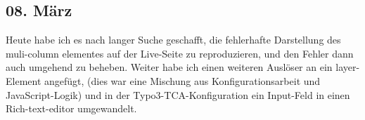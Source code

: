 \subsection{08. März}
Heute habe ich es nach langer Suche geschafft, die fehlerhafte Darstellung des muli-column elementes auf der Live-Seite zu reproduzieren, und den Fehler dann auch umgehend zu beheben. Weiter habe ich einen weiteren Auslöser an ein layer-Element angefügt, (dies war eine Mischung aus Konfigurationsarbeit und JavaScript-Logik) und in der Typo3-TCA-Konfiguration ein Input-Feld in einen Rich-text-editor umgewandelt.